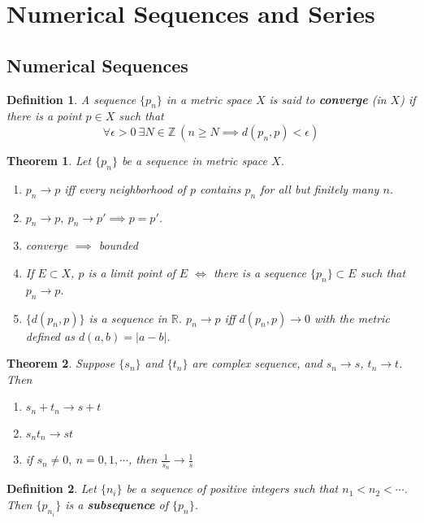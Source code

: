 \documentclass[aps,pra,onecolumn,notitlepage,superscriptaddress]{revtex4-1}
\newcommand{\Z}{\mathbb{Z}}
\newcommand{\R}{\mathbb{R}}
\newtheorem{theo}{Theorem}
\newtheorem{defi}{Definition}
\begin{document}
    \section{Numerical Sequences and Series}
    \subsection{Numerical Sequences}
    \begin{defi}
        A sequence $\{p_n\}$ in a metric space $X$ is said to \textbf{converge} (in $X$) if there is a point $p \in X$ such that
        \begin{equation}
            \forall \epsilon > 0 \ \exists N \in \Z \ (n \geq N \implies d(p_n, p) < \epsilon)
        \end{equation}
    \end{defi}
    \begin{theo}
        Let $\{p_n\}$ be a sequence in metric space $X$.
        \begin{enumerate}
            \item $p_n \to p$ iff every neighborhood of $p$ contains $p_n$ for all but finitely many $n$.
            \item $p_n \to p, \ p_n \to p' \implies p = p'$.
            \item converge $\implies$ bounded
            \item If $E \subset X$, $p$ is a limit point of $E$ $\Longleftrightarrow$ there is a sequence $\{p_n\} \subset E$ such that $p_n \to p$.
            \item $\{d(p_n, p)\}$ is a sequence in $\R$. $p_n \to p$ iff $d(p_n, p) \to 0$ with the metric defined as $d(a,b) = | a-b |$.
        \end{enumerate}
    \end{theo}
    \begin{theo}
        Suppose $\{s_n\}$ and $\{t_n\}$ are complex sequence, and $s_n \to s$, $t_n \to t$. Then
        \begin{enumerate}
            \item $s_n + t_n \to s + t$
            \item $s_nt_n \to st$
            \item if $s_n \neq 0,\ n=0,1,\cdots$, then $\frac{1}{s_n} \to \frac{1}{s}$
        \end{enumerate}
    \end{theo}

    \begin{defi}
        Let $\{n_i\}$ be a sequence of positive integers such that $n_1 < n_2 < \cdots $. Then $\{p_{n_i}\}$ is a \textbf{subsequence} of $\{ p_n \}$.
    \end{defi}
\end{document}

